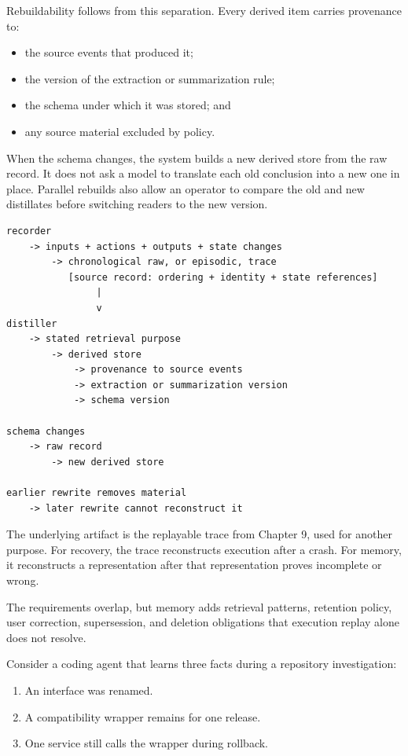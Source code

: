 Rebuildability follows from this separation. Every derived item carries provenance to:

\begin{itemize}
\tightlist
\item
  the source events that produced it;
\item
  the version of the extraction or summarization rule;
\item
  the schema under which it was stored; and
\item
  any source material excluded by policy.
\end{itemize}

When the schema changes, the system builds a new derived store from the raw record. It does not ask a model to translate each old conclusion into a new one in place. Parallel rebuilds also allow an operator to compare the old and new distillates before switching readers to the new version.

\begin{verbatim}
recorder
    -> inputs + actions + outputs + state changes
        -> chronological raw, or episodic, trace
           [source record: ordering + identity + state references]
                |
                v
distiller
    -> stated retrieval purpose
        -> derived store
            -> provenance to source events
            -> extraction or summarization version
            -> schema version

schema changes
    -> raw record
        -> new derived store

earlier rewrite removes material
    -> later rewrite cannot reconstruct it
\end{verbatim}

The underlying artifact is the replayable trace from Chapter 9, used for another purpose. For recovery, the trace reconstructs execution after a crash. For memory, it reconstructs a representation after that representation proves incomplete or wrong.

The requirements overlap, but memory adds retrieval patterns, retention policy, user correction, supersession, and deletion obligations that execution replay alone does not resolve.

Consider a coding agent that learns three facts during a repository investigation:

\begin{enumerate}
\def\labelenumi{\arabic{enumi}.}
\tightlist
\item
  An interface was renamed.
\item
  A compatibility wrapper remains for one release.
\item
  One service still calls the wrapper during rollback.
\end{enumerate}

